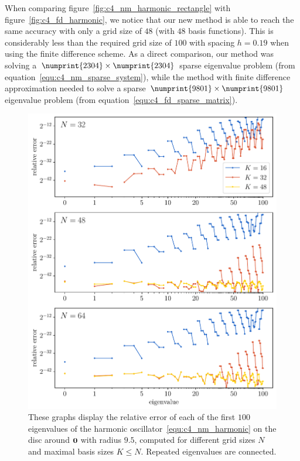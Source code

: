 When comparing figure~\ref{fig:c4_nm_harmonic_rectangle} with figure~\ref{fig:c4_fd_harmonic}, we notice that our new method is able to reach the same accuracy with only a grid size of $48$ (with $48$ basis functions). This is considerably less than the required grid size of $100$ with spacing $h = 0.19$ when using the finite difference scheme. As a direct comparison, our method was solving a $\numprint{2304}\times\numprint{2304}$ sparse eigenvalue problem (from equation~\ref{equ:c4_nm_sparse_system}), while the method with finite difference approximation needed to solve a sparse $\numprint{9801}\times\numprint{9801}$ eigenvalue problem (from equation~\ref{equ:c4_fd_sparse_matrix}).

\begin{figure}
    \begin{center}
        \includegraphics[width=\textwidth]{img/chapter4/nm_test_harmonic_disc.pdf}
    \end{center}
    \caption{These graphs display the relative error of each of the first $100$ eigenvalues of the harmonic oscillator~\eqref{equ:c4_nm_harmonic} on the disc around $\vb{0}$ with radius $9.5$, computed for different grid sizes $N$ and maximal basis sizes $K \leq N$. Repeated eigenvalues are connected.}
    \label{fig:c4_nm_harmonic_disc}
\end{figure}

